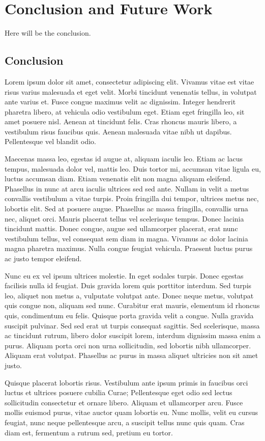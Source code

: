 \chapter{Conclusion and Future Work}\label{Conclusion}

Here will be the conclusion.

\section{Conclusion}

Lorem ipsum dolor sit amet, consectetur adipiscing elit. Vivamus vitae est
vitae risus varius malesuada et eget velit. Morbi tincidunt venenatis tellus,
in volutpat ante varius et. Fusce congue maximus velit ac dignissim. Integer
hendrerit pharetra libero, at vehicula odio vestibulum eget. Etiam eget
fringilla leo, sit amet posuere nisl. Aenean at tincidunt felis. Cras rhoncus
mauris libero, a vestibulum risus faucibus quis. Aenean malesuada vitae nibh
ut dapibus. Pellentesque vel blandit odio.

Maecenas massa leo, egestas id augue at, aliquam iaculis leo. Etiam ac lacus
tempus, malesuada dolor vel, mattis leo. Duis tortor mi, accumsan vitae
ligula eu, luctus accumsan diam. Etiam venenatis elit non magna aliquam
eleifend. Phasellus in nunc at arcu iaculis ultrices sed sed ante. Nullam in
velit a metus convallis vestibulum a vitae turpis. Proin fringilla dui
tempor, ultrices metus nec, lobortis elit. Sed at posuere augue. Phasellus ac
massa fringilla, convallis urna nec, aliquet orci. Mauris placerat tellus vel
scelerisque tempus. Donec lacinia tincidunt mattis. Donec congue, augue sed
ullamcorper placerat, erat nunc vestibulum tellus, vel consequat sem diam in
magna. Vivamus ac dolor lacinia magna pharetra maximus. Nulla congue feugiat
vehicula. Praesent luctus purus ac justo tempor eleifend.

Nunc eu ex vel ipsum ultrices molestie. In eget sodales turpis. Donec egestas
facilisis nulla id feugiat. Duis gravida lorem quis porttitor interdum. Sed
turpis leo, aliquet non metus a, vulputate volutpat ante. Donec neque metus,
volutpat quis congue non, aliquam sed nunc. Curabitur erat mauris, elementum
id rhoncus quis, condimentum eu felis. Quisque porta gravida velit a congue.
Nulla gravida suscipit pulvinar. Sed sed erat ut turpis consequat sagittis.
Sed scelerisque, massa ac tincidunt rutrum, libero dolor suscipit lorem,
interdum dignissim massa enim a purus. Aliquam porta orci non urna
sollicitudin, sed lobortis nibh ullamcorper. Aliquam erat volutpat. Phasellus
ac purus in massa aliquet ultricies non sit amet justo.

Quisque placerat lobortis risus. Vestibulum ante ipsum primis in faucibus orci
luctus et ultrices posuere cubilia Curae; Pellentesque eget odio sed lectus
sollicitudin consectetur et ornare libero. Aliquam et ullamcorper arcu. Fusce
mollis euismod purus, vitae auctor quam lobortis eu. Nunc mollis, velit eu
cursus feugiat, nunc neque pellentesque arcu, a suscipit tellus nunc quis
quam. Cras diam est, fermentum a rutrum sed, pretium eu tortor.
